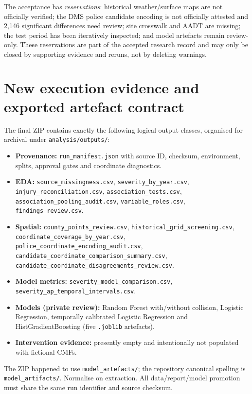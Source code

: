 \documentclass[11pt,a4paper,openany]{report}
\newcommand{\pathcode}[1]{\nolinkurl{#1}}
\begin{document}
The acceptance has \emph{reservations}: historical weather/surface maps are not officially verified; the DMS police candidate encoding is not officially attested and 2,146 significant differences need review; site crosswalk and AADT are missing; the test period has been iteratively inspected; and model artefacts remain review-only. These reservations are part of the accepted research record and may only be closed by supporting evidence and reruns, not by deleting warnings.

\section{New execution evidence and exported artefact contract}
The final ZIP contains exactly the following logical output classes, organised for archival under \pathcode{analysis/outputs/}:
\begin{itemize}
\item \textbf{Provenance:} \pathcode{run_manifest.json} with source ID, checksum, environment, splits, approval gates and coordinate diagnostics.
\item \textbf{EDA:} \pathcode{source_missingness.csv}, \pathcode{severity_by_year.csv}, \pathcode{injury_reconciliation.csv}, \pathcode{association_tests.csv}, \pathcode{association_pooling_audit.csv}, \pathcode{variable_roles.csv}, \pathcode{findings_review.csv}.
\item \textbf{Spatial:} \pathcode{county_points_review.csv}, \pathcode{historical_grid_screening.csv}, \pathcode{coordinate_coverage_by_year.csv}, \pathcode{police_coordinate_encoding_audit.csv}, \pathcode{candidate_coordinate_comparison_summary.csv}, \pathcode{candidate_coordinate_disagreements_review.csv}.
\item \textbf{Model metrics:} \pathcode{severity_model_comparison.csv}, \pathcode{severity_ap_temporal_intervals.csv}.
\item \textbf{Models (private review):} Random Forest with/without collision, Logistic Regression, temporally calibrated Logistic Regression and HistGradientBoosting (five \pathcode{.joblib} artefacts).
\item \textbf{Intervention evidence:} presently empty and intentionally not populated with fictional CMFs.
\end{itemize}
The ZIP happened to use \pathcode{model_artefacts/}; the repository canonical spelling is \pathcode{model_artifacts/}. Normalise on extraction. All data/report/model promotion must share the same run identifier and source checksum.
\end{document}
